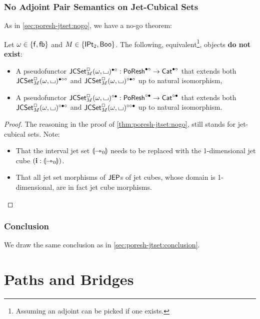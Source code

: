 \documentclass[a4paper]{memoir}
\begin{document}
\subsection{No Adjoint Pair Semantics on Jet-Cubical Sets} \label{sec:poresh-jcset:nogo}
As in \cref{sec:poresh-jtset:nogo}, we have a no-go theorem:
\begin{theorem} \label{thm:poresh-jcset:nogo}
	Let $\omega \in \mathopen{}\left\{ {\mathsf{f}}, {\mathsf{fb}} \right\}\mathclose{}$ and $M \in \mathopen{}\left\{ {\mathsf{IPt}_2}, \mathsf{Boo} \right\}\mathclose{}$.
	The following, equivalent\footnote{Assuming an adjoint can be picked if one exists.}, objects \textbf{do not exist}:
	\begin{itemize}
		\item A pseudofunctor $\mathsf{JCSet}^{\Box}_{M}(\omega,{\llcorner\hspace{-.4ex}\lrcorner})^{\bullet \circ} : \mathsf{PoResh}^{\bullet \circ} \to {\mathsf{Cat}}^{\bullet \circ}$ that extends both $\mathsf{JCSet}^{\Box}_{M}(\omega,{\llcorner\hspace{-.4ex}\lrcorner})^{\bullet \circ \circ}$ and $\mathsf{JCSet}^{\Box}_{M}(\omega,{\llcorner\hspace{-.4ex}\lrcorner})^{\circ \bullet \circ}$ up to natural isomorphism,
		\item A pseudofunctor $\mathsf{JCSet}^{\Box}_{M}(\omega,{\llcorner\hspace{-.4ex}\lrcorner})^{\circ \bullet} : \mathsf{PoResh}^{\circ \bullet} \to {\mathsf{Cat}}^{\circ \bullet}$ that extends both $\mathsf{JCSet}^{\Box}_{M}(\omega,{\llcorner\hspace{-.4ex}\lrcorner})^{\circ \bullet \circ}$ and $\mathsf{JCSet}^{\Box}_{M}(\omega,{\llcorner\hspace{-.4ex}\lrcorner})^{\circ \circ \bullet}$ up to natural isomorphism.
	\end{itemize}
\end{theorem}
\begin{proof}
	The reasoning in the proof of \cref{thm:poresh-jtset:nogo}, still stands for jet-cubical sets. Note:
	\begin{itemize}
		\item That the interval jet set ${\llparenthesis {\rightarrowtriangle}_0 \rrparenthesis}$ needs to be replaced with the 1-dimensional jet cube $(\mathbf{i} : {\llparenthesis {\rightarrowtriangle}_0 \rrparenthesis})$.
		\item That all jet set morphisms of $\mathsf{JEP}$s of jet cubes, whose domain is 1-dimensional, are in fact jet cube morphisms. \qedhere
	\end{itemize}
\end{proof}

\subsection{Conclusion} \label{sec:poresh-jcset:conclusion}
We draw the same conclusion as in \cref{sec:poresh-jtset:conclusion}.

\chapter{Paths and Bridges} \label{ch:pb}
\end{document}

